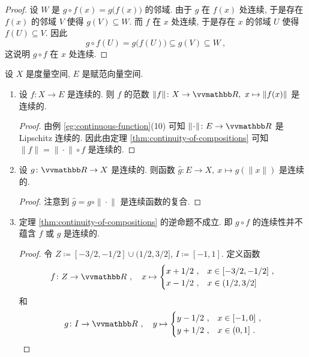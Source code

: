 \begin{proof}
    设 \(W\) 是 \(g \circ f(x) = g\bigl(f(x)\bigr)\) 的邻域. 由于 \(g\) 在 \(f(x)\) 处连续, 于是存在 \(f(x)\) 的邻域 \(V\) 使得 \(g(V) \subseteq W\). 而 \(f\) 在 \(x\) 处连续, 于是存在 \(x\) 的邻域 \(U\) 使得 \(f(U) \subseteq V\). 因此
    \[
        g \circ f(U) = g\bigl(f(U)\bigr) \subseteq g(V) \subseteq W\ ,
    \]
    这说明 \(g \circ f\) 在 \(x\) 处连续.
\end{proof}

\begin{example}
    设 \(X\) 是度量空间, \(E\) 是赋范向量空间.
    \begin{enumerate}
        \item 设 \(f \colon X \to E\) 是连续的. 则 \(f\) 的范数 \(\|f\| \colon X \to \R,\ x \mapsto \|f(x)\|\) 是连续的.
        \begin{proof}
            由例 \ref{eg:continuous-function}(10) 可知 \(\|\!\cdot\!\| \colon E \to \R\) 是 Lipschitz 连续的. 因此由定理 \ref{thm:continuity-of-compositions} 可知 \(\|f\| = \|\!\cdot\!\| \circ f\) 是连续的.
        \end{proof}
        \item 设 \(g \colon \R \to X\) 是连续的. 则函数 \(\widehat g \colon E \to X,\ x \mapsto g(\|x\|)\) 是连续的.
        \begin{proof}
            注意到 \(\widehat g = g \circ \|\!\cdot\!\|\) 是连续函数的复合.
        \end{proof}
        \item 定理 \ref{thm:continuity-of-compositions} 的逆命题不成立. 即 \(g \circ f\) 的连续性并不蕴含 \(f\) 或 \(g\) 是连续的.
        \begin{proof}
            令 \(Z \coloneqq [- 3 / 2, - 1 / 2] \cup (1 / 2, 3 / 2]\), \(I \coloneqq [- 1, 1]\). 定义函数
            \[
                f \colon Z \to \R\ ,\quad x \mapsto
                \begin{cases}
                    x + 1 / 2\ , & x \in [- 3 / 2, - 1 / 2]\ , \\
                    x - 1 / 2\ , & x \in (1 / 2, 3 / 2]
                \end{cases}
            \]
            和
            \[
                g \colon I \to \R\ ,\quad y \mapsto
                \begin{cases}
                    y - 1 / 2\ , & x \in [- 1, 0]\ , \\
                    y + 1 / 2\ , & x \in (0, 1]\ .
                \end{cases}
\]
\end{proof}
\end{enumerate}
\end{example}
